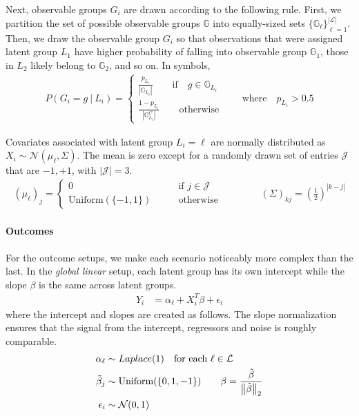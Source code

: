 \documentclass{article}
\theoremstyle{plain}
\theoremstyle{definition}
\theoremstyle{remark}
\begin{document}
\noindent Next, observable groups $G_{i}$ are drawn according to the following rule. First, we partition the set of possible observable groups $\mathbb{G}$ into equally-sized sets $\{\mathbb{G}_{\ell}\}_{\ell=1}^{|\mathcal{L}|}$. Then, we draw the observable group $G_{i}$ so that observations that were assigned latent group $L_{1}$ have higher probability of falling into observable group $\mathbb{G}_{1}$, those in $L_{2}$ likely belong to $\mathbb{G}_{2}$, and so on. In symbols,
\begin{align}
    P(G_{i} = g \ | \ L_{i}) =
        \begin{cases}
            \frac{p_{L_{i}}}{|\mathbb{G}_{L_{i}}|}
            \qquad \text{if}\quad g \in \mathbb{G}_{L_{i}}\\
            \frac{1-p_{L_{i}}}{|\mathbb{G}_{L_{i}}^{C}|} \qquad \text{otherwise}
        \end{cases}
    \qquad
    \text{where} \quad p_{L_{i}} > 0.5
\end{align}

Covariates associated with latent group $L_{i} = \ell$ are normally distributed as $X_{i} \sim \mathcal{N}(\mu_{\ell}, \Sigma)$. The mean is zero except for a randomly drawn set of entries $\mathcal{J}$ that are ${-1, +1}$, with $|\mathcal{J}| = 3$.
\begin{align}
  (\mu_{\ell})_{j} =
  \begin{cases}
    0 \qquad &\text{if } j \in \mathcal{J}\\
    \text{Uniform}(\{-1, 1\}) \qquad &\text{otherwise}
  \end{cases}
  \qquad \qquad
  (\Sigma)_{kj} = \left(\frac{1}{2}\right)^{|k - j|}
\end{align}

\paragraph{Outcomes} For the outcome setups, we make each scenario noticeably more complex than the last. In the \emph{global linear} setup, each latent group has its own intercept while the slope $\beta$ is the same across latent groups.
\begin{align}
  Y_{i} &= \alpha_{\ell} + X_{i}^{T}\beta + \epsilon_{i} \label{eq:linear_outcome}
\end{align}
where the intercept and slopes are created as follows. The slope normalization ensures that the signal from the intercept, regressors and noise is roughly comparable.
\begin{align}
\alpha_{\ell} &\sim Laplace(1) \quad \text{for each }\ell \in \mathcal{L} \label{eq:intercept} \\
\tilde{\beta}_{j} &\sim \text{Uniform}(\{0, 1, -1\}) \qquad \beta = \frac{\tilde{\beta}}{\left\lVert\tilde{\beta}\right\rVert_{2}} \label{eq:slopes} \\
\epsilon_{i} &\sim \mathcal{N}(0, 1)
\end{align}
\end{document}
